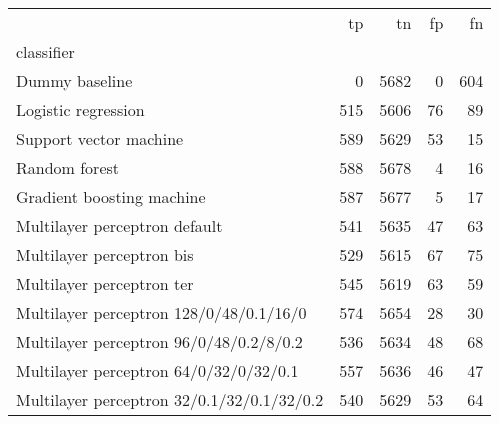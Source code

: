 \begin{tabular}{lrrrr}
\toprule
 & tp & tn & fp & fn \\
classifier &  &  &  &  \\
\midrule
Dummy baseline & 0 & 5682 & 0 & 604 \\
Logistic regression & 515 & 5606 & 76 & 89 \\
Support vector machine & 589 & 5629 & 53 & 15 \\
Random forest & 588 & 5678 & 4 & 16 \\
Gradient boosting machine & 587 & 5677 & 5 & 17 \\
Multilayer perceptron default & 541 & 5635 & 47 & 63 \\
Multilayer perceptron bis & 529 & 5615 & 67 & 75 \\
Multilayer perceptron ter & 545 & 5619 & 63 & 59 \\
Multilayer perceptron 128/0/48/0.1/16/0 & 574 & 5654 & 28 & 30 \\
Multilayer perceptron 96/0/48/0.2/8/0.2 & 536 & 5634 & 48 & 68 \\
Multilayer perceptron 64/0/32/0/32/0.1 & 557 & 5636 & 46 & 47 \\
Multilayer perceptron 32/0.1/32/0.1/32/0.2 & 540 & 5629 & 53 & 64 \\
\bottomrule
\end{tabular}
